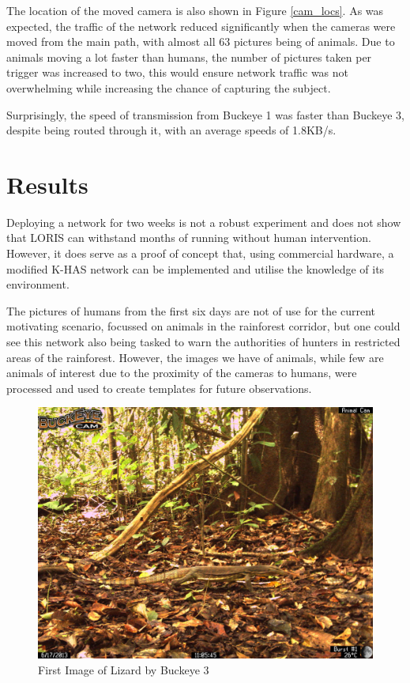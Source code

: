 		The location of the moved camera is also shown in Figure \ref{cam_locs}. As was expected, the traffic of the network reduced significantly when the cameras were moved from the main path, with almost all 63 pictures being of animals. Due to animals moving a lot faster than humans, the number of pictures taken per trigger was increased to two, this would ensure network traffic was not overwhelming while increasing the chance of capturing the subject.
		
		Surprisingly, the speed of transmission from Buckeye 1 was faster than Buckeye 3, despite being routed through it, with an average speeds of 1.8KB/s.				
		\section{Results}\label{loris:res}
		Deploying a network for two weeks is not a robust experiment and does not show that LORIS can withstand months of running without human intervention. However, it does serve as a proof of concept that, using commercial hardware, a modified K-HAS network can be implemented and utilise the knowledge of its environment.
		
		The pictures of humans from the first six days are not of use for the current motivating scenario, focussed on animals in the rainforest corridor, but one could see this network also being tasked to warn the authorities of hunters in restricted areas of the rainforest. However, the images we have of animals, while few are animals of interest due to the proximity of the cameras to humans, were processed and used to create templates for future observations. 
		
		    \begin{figure}[h]
		    \centering
			\includegraphics[width=\textwidth]{Chap6/figures/buckeye_img}
		    \caption{First Image of Lizard by Buckeye 3}
		    \label{buckeye_img}
		    \end{figure}
		

